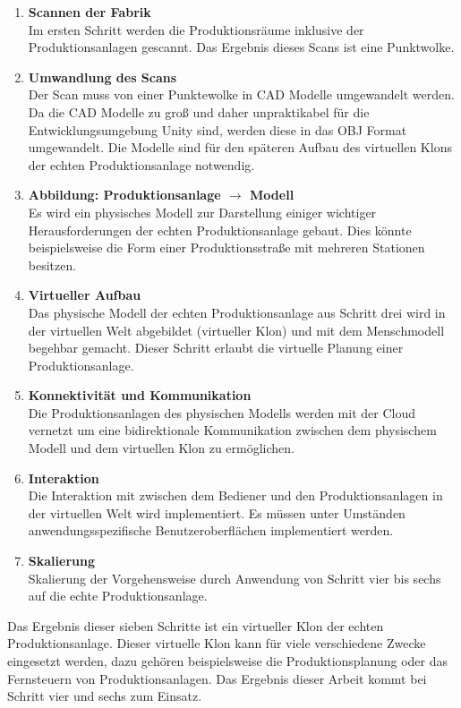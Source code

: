 \begin{enumerate}
	\item \textbf{Scannen der Fabrik} \\
	Im ersten Schritt werden die Produktionsräume inklusive der Produktionsanlagen gescannt. Das Ergebnis dieses Scans ist eine Punktwolke.
	\item \textbf{Umwandlung des Scans} \\
	Der Scan muss von einer Punktewolke in CAD Modelle umgewandelt werden. Da die CAD Modelle zu groß und daher unpraktikabel für die Entwicklungsumgebung Unity sind, werden diese in das OBJ Format umgewandelt. Die Modelle sind für den späteren Aufbau des virtuellen Klons der echten Produktionsanlage notwendig.
	\item \textbf{Abbildung: Produktionsanlage $\rightarrow$ Modell} \\
	Es wird ein physisches Modell zur Darstellung einiger wichtiger Herausforderungen der echten Produktionsanlage gebaut. Dies könnte beispielsweise die Form einer Produktionsstraße mit mehreren Stationen besitzen.
	\item \textbf{Virtueller Aufbau} \\
	Das physische Modell der echten Produktionsanlage aus Schritt drei wird in der virtuellen Welt abgebildet (virtueller Klon) und mit dem Menschmodell begehbar gemacht. Dieser Schritt erlaubt die virtuelle Planung einer Produktionsanlage.
	\item \textbf{Konnektivität und Kommunikation} \\
	Die Produktionsanlagen des physischen Modells werden mit der Cloud vernetzt um eine bidirektionale Kommunikation zwischen dem physischem Modell und dem virtuellen Klon zu ermöglichen.
	\item \textbf{Interaktion} \\
	Die Interaktion mit zwischen dem Bediener und den Produktionsanlagen in der virtuellen Welt wird implementiert. Es müssen unter Umständen anwendungsspezifische Benutzeroberflächen implementiert werden.
	\item \textbf{Skalierung} \\
	Skalierung der Vorgehensweise durch Anwendung von Schritt vier bis sechs auf die echte Produktionsanlage.
\end{enumerate}
Das Ergebnis dieser sieben Schritte ist ein virtueller Klon der echten Produktionsanlage. Dieser virtuelle Klon kann für viele verschiedene Zwecke eingesetzt werden, dazu gehören beispielsweise die Produktionsplanung oder das Fernsteuern von Produktionsanlagen. Das Ergebnis dieser Arbeit kommt bei Schritt vier und sechs zum Einsatz.

